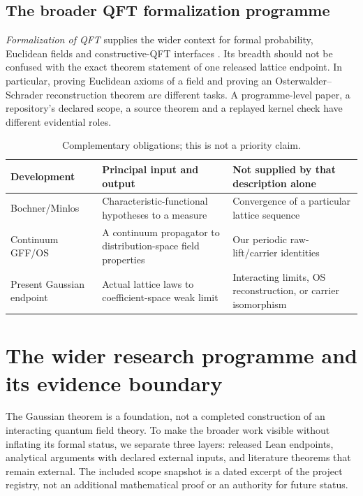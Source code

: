 \documentclass[11pt]{amsart}
\theoremstyle{remark}\newtheorem{remark}[theorem]{Remark}
\begin{document}
\subsection{The broader QFT formalization programme}
\emph{Formalization of QFT} supplies the wider context for formal probability, Euclidean fields and constructive-QFT interfaces \cite{FormalQFT}. Its breadth should not be confused with the exact theorem statement of one released lattice endpoint. In particular, proving Euclidean axioms of a field and proving an Osterwalder--Schrader reconstruction theorem are different tasks. A programme-level paper, a repository's declared scope, a source theorem and a replayed kernel check have different evidential roles.

\begin{table}[ht]
\centering\small
\caption{Complementary obligations; this is not a priority claim.}
\begin{tabular}{@{}>{\raggedright\arraybackslash}p{}>{\raggedright\arraybackslash}p{}>{\raggedright\arraybackslash}p{}@{}}
\toprule
Development & Principal input and output & Not supplied by that description alone\\\midrule
Bochner/Minlos & Characteristic-functional hypotheses to a measure & Convergence of a particular lattice sequence\\
Continuum GFF/OS & A continuum propagator to distribution-space field properties & Our periodic raw-lift/carrier identities\\
Present Gaussian endpoint & Actual lattice laws to coefficient-space weak limit & Interacting limits, OS reconstruction, or carrier isomorphism\\\bottomrule
\end{tabular}
\end{table}

\section{The wider research programme and its evidence boundary}\label{sec:scope}
The Gaussian theorem is a foundation, not a completed construction of an interacting quantum field theory. To make the broader work visible without inflating its formal status, we separate three layers: released Lean endpoints, analytical arguments with declared external inputs, and literature theorems that remain external. The included scope snapshot is a dated excerpt of the project registry, not an additional mathematical proof or an authority for future status.
\end{document}
